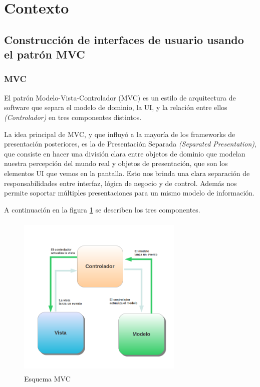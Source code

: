 \section{Contexto}
\subsection{Construcción de interfaces de usuario usando el patrón MVC}

	\subsubsection{MVC}
	El patrón Modelo-Vista-Controlador (MVC) es un estilo de arquitectura de
	software que separa el modelo de dominio, la UI,
	y la relación entre ellos \emph{(Controlador)} en tres componentes distintos.
	\cite{burbeck87}
	
	La idea principal de MVC, y que influyó a la mayoría de los frameworks de
	presentación posteriores, es la de Presentación Separada \emph{(Separated
	Presentation)}, que consiste en hacer una división clara entre objetos de 
	dominio que modelan nuestra percepción del mundo real y objetos de presentación, 
	que son los elementos UI que vemos en la pantalla. 
	Esto nos brinda una clara separación de responsabilidades entre interfaz,
	lógica de negocio y de control. Además nos permite soportar múltiples
	presentaciones para un mismo modelo de información. \cite{reenskaug79}
	\bigskip
	
	A continuación en la figura \ref{mvc} se describen los tres componentes.  
	
	\begin{figure}[h]
		\centering
		\includegraphics[width=300px, height=300px]{img/mvc} 
		\caption{Esquema MVC}
		\label{mvc}
	\end{figure}  
	

